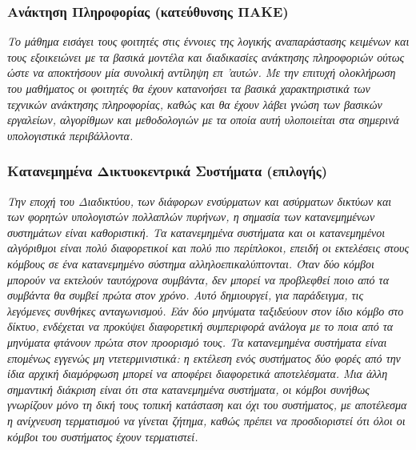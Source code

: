 \hypertarget{ux3b1ux3bdux3acux3baux3c4ux3b7ux3c3ux3b7-ux3c0ux3bbux3b7ux3c1ux3bfux3c6ux3bfux3c1ux3afux3b1ux3c2-ux3baux3b1ux3c4ux3b5ux3cdux3b8ux3c5ux3bdux3c3ux3b7ux3c2-ux3c0ux3b1ux3baux3b5}{%
\subsubsection{Ανάκτηση Πληροφορίας (κατεύθυνσης
ΠΑΚΕ)}\label{ux3b1ux3bdux3acux3baux3c4ux3b7ux3c3ux3b7-ux3c0ux3bbux3b7ux3c1ux3bfux3c6ux3bfux3c1ux3afux3b1ux3c2-ux3baux3b1ux3c4ux3b5ux3cdux3b8ux3c5ux3bdux3c3ux3b7ux3c2-ux3c0ux3b1ux3baux3b5}}

\emph{Το μάθημα εισάγει τους φοιτητές στις έννοιες της λογικής
αναπαράστασης κειμένων και τους εξοικειώνει με τα βασικά μοντέλα και
διαδικασίες ανάκτησης πληροφοριών ούτως ώστε να αποκτήσουν μία συνολική
αντίληψη επ 'αυτών. Με την επιτυχή ολοκλήρωση του μαθήματος οι φοιτητές
θα έχουν κατανοήσει τα βασικά χαρακτηριστικά των τεχνικών ανάκτησης
πληροφορίας, καθώς και θα έχουν λάβει γνώση των βασικών εργαλείων,
αλγορίθμων και μεθοδολογιών με τα οποία αυτή υλοποιείται στα σημερινά
υπολογιστικά περιβάλλοντα.}

\hypertarget{ux3baux3b1ux3c4ux3b1ux3bdux3b5ux3bcux3b7ux3bcux3adux3bdux3b1-ux3b4ux3b9ux3baux3c4ux3c5ux3bfux3baux3b5ux3bdux3c4ux3c1ux3b9ux3baux3ac-ux3c3ux3c5ux3c3ux3c4ux3aeux3bcux3b1ux3c4ux3b1-ux3b5ux3c0ux3b9ux3bbux3bfux3b3ux3aeux3c2}{%
\subsubsection{Κατανεμημένα Δικτυοκεντρικά Συστήματα
(επιλογής)}\label{ux3baux3b1ux3c4ux3b1ux3bdux3b5ux3bcux3b7ux3bcux3adux3bdux3b1-ux3b4ux3b9ux3baux3c4ux3c5ux3bfux3baux3b5ux3bdux3c4ux3c1ux3b9ux3baux3ac-ux3c3ux3c5ux3c3ux3c4ux3aeux3bcux3b1ux3c4ux3b1-ux3b5ux3c0ux3b9ux3bbux3bfux3b3ux3aeux3c2}}

\emph{Την εποχή του Διαδικτύου, των διάφορων ενσύρματων και ασύρματων
δικτύων και των φορητών υπολογιστών πολλαπλών πυρήνων, η σημασία των
κατανεμημένων συστημάτων είναι καθοριστική. Τα κατανεμημένα συστήματα
και οι κατανεμημένοι αλγόριθμοι είναι πολύ διαφορετικοί και πολύ πιο
περίπλοκοι, επειδή οι εκτελέσεις στους κόμβους σε ένα κατανεμημένο
σύστημα αλληλοεπικαλύπτονται. Όταν δύο κόμβοι μπορούν να εκτελούν
ταυτόχρονα συμβάντα, δεν μπορεί να προβλεφθεί ποιο από τα συμβάντα θα
συμβεί πρώτα στον χρόνο. Αυτό δημιουργεί, για παράδειγμα, τις λεγόμενες
συνθήκες ανταγωνισμού. Εάν δύο μηνύματα ταξιδεύουν στον ίδιο κόμβο στο
δίκτυο, ενδέχεται να προκύψει διαφορετική συμπεριφορά ανάλογα με το ποια
από τα μηνύματα φτάνουν πρώτα στον προορισμό τους. Τα κατανεμημένα
συστήματα είναι επομένως εγγενώς μη ντετερμινιστικά: η εκτέλεση ενός
συστήματος δύο φορές από την ίδια αρχική διαμόρφωση μπορεί να αποφέρει
διαφορετικά αποτελέσματα. Μια άλλη σημαντική διάκριση είναι ότι στα
κατανεμημένα συστήματα, οι κόμβοι συνήθως γνωρίζουν μόνο τη δική τους
τοπική κατάσταση και όχι του συστήματος, με αποτέλεσμα η ανίχνευση
τερματισμού να γίνεται ζήτημα, καθώς πρέπει να προσδιοριστεί ότι όλοι οι
κόμβοι του συστήματος έχουν τερματιστεί.}

